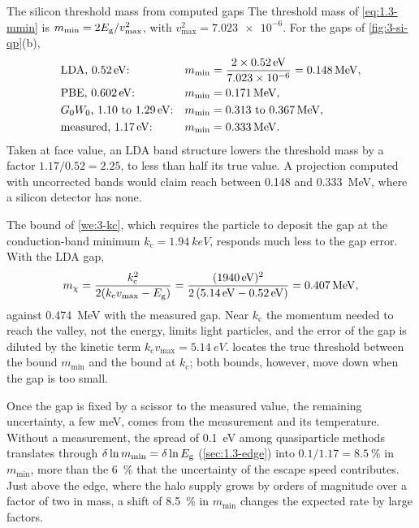 \begin{workedexample}{The silicon threshold mass from computed gaps}\label{we:3-mmin-gap}
The threshold mass of \cref{eq:1.3-mmin} is $m_{\mathrm{min}} = 2E_{\mathrm{g}}/v_{\mathrm{max}}^2$, with $v_{\mathrm{max}}^2 = \num{7.023e-6}$. For the gaps of \cref{fig:3-si-qp}(b),
\begin{equation*}
  \begin{aligned}
  &\text{LDA, \SI{0.52}{eV}:} & m_{\mathrm{min}} &= \frac{2\times\SI{0.52}{eV}}{\num{7.023e-6}} = \SI{0.148}{MeV}, \\
  &\text{PBE, \SI{0.602}{eV}:} & m_{\mathrm{min}} &= \SI{0.171}{MeV}, \\
  &\text{$G_0W_0$, 1.10 to \SI{1.29}{eV}:} & m_{\mathrm{min}} &= 0.313 \text{ to } \SI{0.367}{MeV}, \\
  &\text{measured, \SI{1.17}{eV}:} & m_{\mathrm{min}} &= \SI{0.333}{MeV}.
  \end{aligned}
\end{equation*}
Taken at face value, an LDA band structure lowers the threshold mass by a factor $1.17/0.52 = 2.25$, to less than half its true value. A projection computed with uncorrected bands would claim reach between 0.148 and \SI{0.333}{MeV}, where a silicon detector has none.

The bound of \cref{we:3-kc}, which requires the particle to deposit the gap at the conduction-band minimum $k_{\mathrm{c}} = \SI{1.94}{keV}$, responds much less to the gap error. With the LDA gap,
\begin{equation*}
  m_{\chi} = \frac{k_{\mathrm{c}}^2}{2(k_{\mathrm{c}}v_{\mathrm{max}} - E_{\mathrm{g}})} = \frac{(\SI{1940}{eV})^2}{2\,(\SI{5.14}{eV} - \SI{0.52}{eV})} = \SI{0.407}{MeV},
\end{equation*}
against \SI{0.474}{MeV} with the measured gap. Near $k_{\mathrm{c}}$ the momentum needed to reach the valley, not the energy, limits light particles, and the error of the gap is diluted by the kinetic term $k_{\mathrm{c}}v_{\mathrm{max}} = \SI{5.14}{eV}$.  locates the true threshold between the bound $m_{\mathrm{min}}$ and the bound at $k_{\mathrm{c}}$; both bounds, however, move down when the gap is too small.

Once the gap is fixed by a scissor to the measured value, the remaining uncertainty, a few meV, comes from the measurement and its temperature. Without a measurement, the spread of \SI{0.1}{eV} among quasiparticle methods translates through $\delta\ln m_{\mathrm{min}} = \delta\ln E_{\mathrm{g}}$ (\cref{sec:1.3-edge}) into $0.1/1.17 = \SI{8.5}{\percent}$ in $m_{\mathrm{min}}$, more than the \SI{6}{\percent} that the uncertainty of the escape speed contributes. Just above the edge, where the halo supply grows by orders of magnitude over a factor of two in mass, a shift of \SI{8.5}{\percent} in $m_{\mathrm{min}}$ changes the expected rate by large factors.
\end{workedexample}

